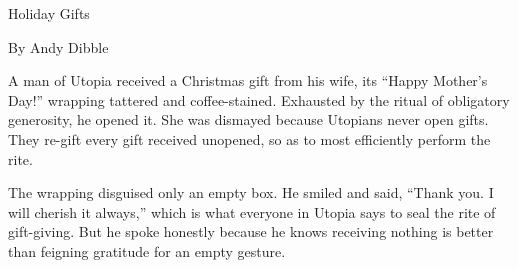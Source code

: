 Holiday Gifts

By Andy Dibble

A man of Utopia received a Christmas gift from his wife, its ``Happy
Mother's Day!'' wrapping tattered and coffee-stained. Exhausted by the
ritual of obligatory generosity, he opened it. She was dismayed because
Utopians never open gifts. They re-gift every gift received unopened, so
as to most efficiently perform the rite.

The wrapping disguised only an empty box. He smiled and said, ``Thank
you. I will cherish it always,'' which is what everyone in Utopia says
to seal the rite of gift-giving. But he spoke honestly because he knows
receiving nothing is better than feigning gratitude for an empty
gesture.
